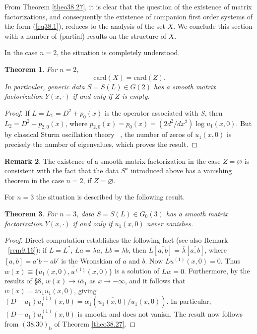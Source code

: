 \documentclass{surv-l}
\theoremstyle{plain}
\newtheorem{theorem}{Theorem}[section]
\theoremstyle{definition}
\newtheorem{remark}[theorem]{Remark}
\numberwithin{equation}{chapter}
\begin{document}
From Theorem \ref{theo38.27}, it is clear that the question of the existence of matrix factorizations, and consequently the existence of companion first order systems of the form (\ref{eq38.1}), reduces to the analysis of the set $X$. We conclude this section with a number of (partial) results on the structure of $X$.

In the case $n=2$, the situation is completely understood.

\begin{theorem}\label{thm38.45} For $n=2$,
\begin{equation*}
\mathrm{card}(X) = \mathrm{card} (Z).
\end{equation*}
In particular, generic data $S=S(L)\in G(2)$ has a smooth matrix factorization $Y(x,\cdot)$ if and only if $Z$ is empty.
\end{theorem}

\begin{proof} If $L=L_{1}=D^{2}+p_{0}(x)$ is the operator associated with $S$, then $L_{2}=D^{2}+p_{2,0}(x)$, where $p_{2,0}(x)=p_{0}(x)=(2d^{2}/dx^{2})\log u_{1}(x, 0)$. But by classical Sturm oscillation theory ~\cite{CL}, the number of zeros of $u_{1}(x, 0)$ is precisely the number of eigenvalues, which proves the result.
\end{proof}

\begin{remark}\label{rem38.46} The existence of a smooth matrix factorization in the case $ Z=\varnothing$ is consistent with the fact that the data $S^{x}$ introduced above has a vanishing theorem in the case $n=2$, if $ Z=\varnothing$.

For $n=3$ the situation is described by the following result.
\end{remark}

\begin{theorem}\label{thm38.47}  For $n=3$, data $S=S(L)\in G_{0}(3)$ has a smooth matrix factorization $Y(x, \cdot)$ if and only if $u_{1}(x,0)$ never vanishes.
\end{theorem}

\begin{proof}  Direct computation establishes the following fact (see also Remark ~\ref{rem9.16}): if $L=L^{*}$, $La=\lambda a$, $Lb=\lambda b$, then $L[\overline{a,b}]=\overline{\lambda}[\overline{a,b}]$, where $[a,b]=a'b-ab'$ is the Wronskian of $a$ and $b$. Now $Lu^{(1)} (x, 0)=0$. Thus $ w(x)\equiv \{\overline{u_{1}(x,0),u^{(1)}(x,0)}\}$ is a solution of $Lw=0$. Furthermore, by the results of \S 8, $w(x)\rightarrow i\bar{\alpha}_{1}$ as $ x\rightarrow-\infty$, and it follows that $w(x)=i\bar{\alpha}_{1}u_{1}(x,0)$, giving $(D-a_{1})u_{1}^{(1)}(x,0)=\alpha_{1}(\overline{u_{1}(x,0)}/u_{1}(x,0))$. In particular, $(D-a_{1})u_{1}^{(1)}(x,0)$ is smooth and does not vanish. The result now follows from $(38.30)_{\mathrm{b}}$ of Theorem \ref{theo38.27}.
\end{proof}
\end{document}
